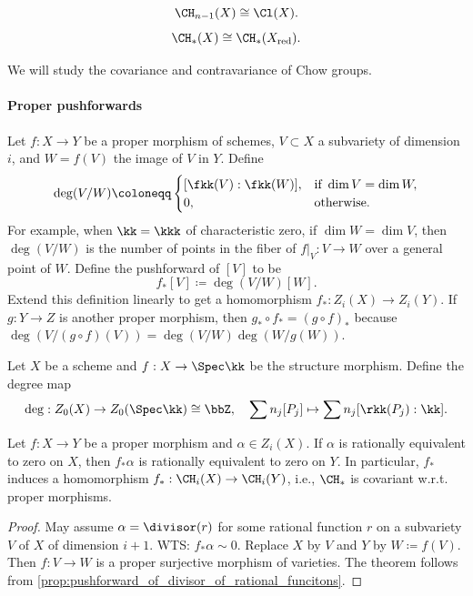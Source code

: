     \begin{example}
        \[ \CH_{n-1}(X) \cong \Cl(X). \]
        \[ \CH_{*}(X) \cong \CH_*(X_{\text{red}}). \]
    \end{example}

    We will study the covariance and contravariance of Chow groups.

    \paragraph{Proper pushforwards}
    Let \(f: X \to Y\) be a proper morphism of schemes, \(V \subset X\) a subvariety of dimension \(i\), and \(W = f(V)\) the image of \(V\) in \(Y\). 
    Define 
    \[ \deg(V/W) \coloneqq \begin{cases}
        [\fkk(V):\fkk(W)], & \text{if } \dim V = \dim W, \\
        0, & \text{otherwise}.
    \end{cases} \]
    For example, when \(\kk=\kkk\) of characteristic zero, if \(\dim W = \dim V\), then \(\deg(V/W)\) is the number of points in the fiber of \(f|_V: V \to W\) over a general point of \(W\).
    Define the pushforward of \([V]\) to be
    \[ f_*[V] \coloneqq \deg(V/W) [W]. \]
    Extend this definition linearly to get a homomorphism \(f_*: Z_i(X) \to Z_i(Y)\). 
    If \(g: Y \to Z\) is another proper morphism, then \(g_* \circ f_* = (g \circ f)_*\) because \(\deg(V/(g \circ f)(V)) = \deg(V/W) \deg(W/g(W))\).

    \begin{example}
        Let \(X\) be a scheme and \(f:X \to \Spec \kk\) be the structure morphism. 
        Define the degree map
        \[ \deg: Z_0(X) \to Z_0(\Spec \kk) \cong \bbZ, \quad \sum n_j [P_j] \mapsto \sum n_j [\rkk(P_j):\kk]. \]
    \end{example}

    \begin{theorem}
        Let \(f: X \to Y\) be a proper morphism and \(\alpha \in Z_i(X)\).
        If \(\alpha\) is rationally equivalent to zero on \(X\), then \(f_*\alpha\) is rationally equivalent to zero on \(Y\).
        In particular, \(f_*\) induces a homomorphism \(f_*: \CH_i(X) \to \CH_i(Y)\), i.e., \(\CH_*\) is covariant w.r.t. proper morphisms.
    \end{theorem}
    \begin{proof}
        May assume \(\alpha = \divisor(r)\) for some rational function \(r\) on a subvariety \(V\) of \(X\) of dimension \(i+1\).
        WTS: \(f_*\alpha \sim 0\).
        Replace \(X\) by \(V\) and \(Y\) by \(W \coloneqq f(V)\). 
        Then \(f: V \to W\) is a proper surjective morphism of varieties.
        The theorem follows from \cref{prop:pushforward_of_divisor_of_rational_funcitons}.
    \end{proof}

